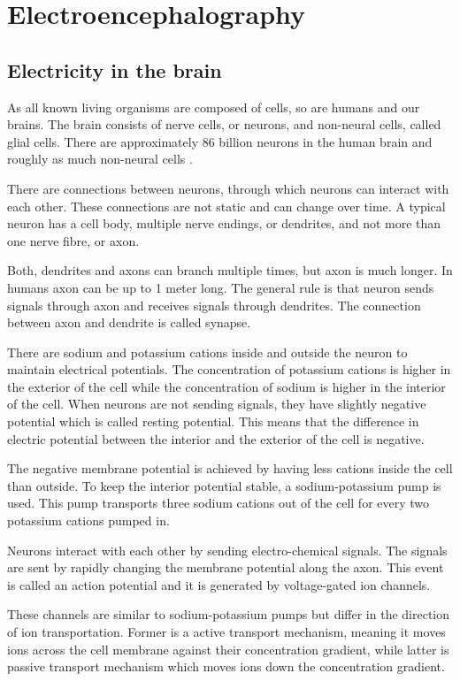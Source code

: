 
\chapter{Electroencephalography}
\section{Electricity in the brain}
As all known living organisms are composed of cells, so are humans and our brains. The brain consists of nerve cells, or neurons, and non-neural cells, called glial cells. There are approximately 86 billion neurons in the human brain and roughly as much non-neural cells \cite{neuroncount}.

There are connections between neurons, through which neurons can interact with each other. These connections are not static and can change over time. A typical neuron has a cell body, multiple nerve endings, or dendrites, and not more than one nerve fibre, or axon.

Both, dendrites and axons can branch multiple times, but axon is much longer. In humans axon can be up to 1 meter long. The general rule is that neuron sends signals through axon and receives signals through dendrites. The connection between axon and dendrite is called synapse. 

There are sodium and potassium cations inside and outside the neuron to maintain electrical potentials. The concentration of potassium cations is higher in the exterior of the cell while the concentration of sodium is higher in the interior of the cell. When neurons are not sending signals, they have slightly negative potential which is called resting potential. This means that the difference in electric potential between the interior and the exterior of the cell is negative. 

The negative membrane potential is achieved by having less cations inside the cell than outside. To keep the interior potential stable, a sodium-potassium pump is used. This pump transports three sodium cations out of the cell for every two potassium cations pumped in.

Neurons interact with each other by sending electro-chemical signals. The signals are sent by rapidly changing the membrane potential along the axon. This event is called an action potential and it is generated by voltage-gated ion channels.

These channels are similar to sodium-potassium pumps but differ in the direction of ion transportation. Former is a active transport mechanism, meaning it moves ions across the cell membrane against their concentration gradient, while latter is passive transport mechanism which moves ions down the concentration gradient.

